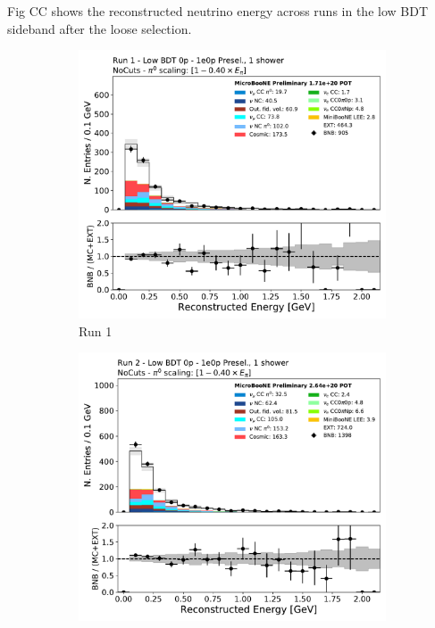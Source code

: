 Fig CC shows the reconstructed neutrino energy across runs in the low BDT sideband after the loose selection. 
\begin{figure}[H]
    \centering
    \begin{subfigure}{0.3\textwidth}
    \includegraphics[width=1.0\textwidth]{1e0p/Low_BDT_Sideband/run1/reco_e.pdf}
    \caption{Run 1}
    \end{subfigure}
    \begin{subfigure}{0.3\textwidth}
    \includegraphics[width=1.0\textwidth]{1e0p/Low_BDT_Sideband/run2/reco_e.pdf}

\end{subfigure}
\end{figure}
